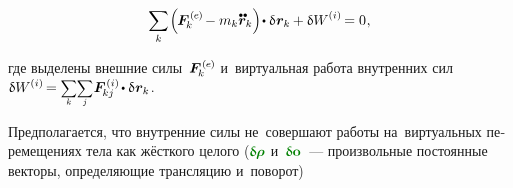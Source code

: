 \begin{otherlanguage}{russian}
\nopagebreak\vspace{-0.2em}\begin{equation}\label{discrete:principleofvirtualwork.externalinternal}
\displaystyle \sum_k \hspace{-0.2ex} \left(^{\mathstrut} \hspace{-0.25ex} \bm{F}^{\expexternal}_{\hspace{-0.16ex}k} \hspace{-0.1ex} - m_k \mathdotdotabove{\bm{r}}_k \right) \hspace{-0.32ex} \dotp \variation{\hspace{.1ex}\bm{r}_k} \hspace{-0.1ex}
+ \variation{\internalwork} \hspace{-0.1ex} = 0 \hspace{.1ex},
\vspace{-0.25em}\end{equation}

\vspace{-0.1em} \noindent где выделены внешние силы~${\bm{F}^{\expexternal}_{\hspace{-0.16ex}k}}$ и~виртуальная работа внутренних сил
${\variation{\internalwork} \hspace{-0.12ex} = \scalebox{0.8}[0.84]{$\displaystyle \underset{\raisemath{.25ex}{\smash{k}}}{\sum}$} \scalebox{0.8}[0.84]{$\displaystyle \underset{\raisemath{.25ex}{\smash{j}}}{\sum}$} \hspace{.12ex} \bm{F}^{\expinternal}_{\hspace{-0.16ex}kj} \hspace{-0.1ex} \dotp \variation{\hspace{.1ex}\bm{r}_k} \hspace{.1ex}}$.

\vspace{-0.1em} Предполагается, что внутренние силы не~совершают работы на~виртуальных перемещениях тела как жёсткого целого (${\constvarvector{\hspace{-0.1ex}\bm{\rho}}}$ и~${\constvarvector{\bm{o}}}$~--- произвольные постоянные векторы, определяющие трансляцию и~поворот)


\end{otherlanguage}

